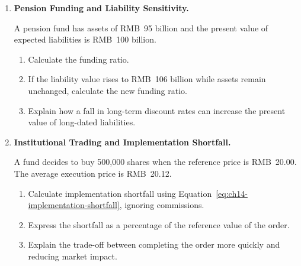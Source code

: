 \begin{enumerate}
An ETF has NAV per share of RMB~4.00 and trades at RMB~4.08.

\begin{enumerate}

\item Calculate the percentage premium to NAV.

\item Describe the sequence of a potential creation trade when the premium is large
enough to cover transaction and funding costs.

\item Explain why a premium or discount need not disappear immediately when the
underlying securities are illiquid or their markets are closed.

\end{enumerate}

\item \textbf{Pension Funding and Liability Sensitivity.}

A pension fund has assets of RMB~95 billion and the present value of expected
liabilities is RMB~100 billion.

\begin{enumerate}

\item Calculate the funding ratio.

\item If the liability value rises to RMB~106 billion while assets remain unchanged,
calculate the new funding ratio.

\item Explain how a fall in long-term discount rates can increase the present value
of long-dated liabilities.

\end{enumerate}

\item \textbf{Institutional Trading and Implementation Shortfall.}

A fund decides to buy 500,000 shares when the reference price is RMB~20.00.
The average execution price is RMB~20.12.

\begin{enumerate}

\item Calculate implementation shortfall using
Equation~\ref{eq:ch14-implementation-shortfall}, ignoring commissions.

\item Express the shortfall as a percentage of the reference value of the order.

\item Explain the trade-off between completing the order more quickly and reducing
market impact.

\end{enumerate}

\end{enumerate}

